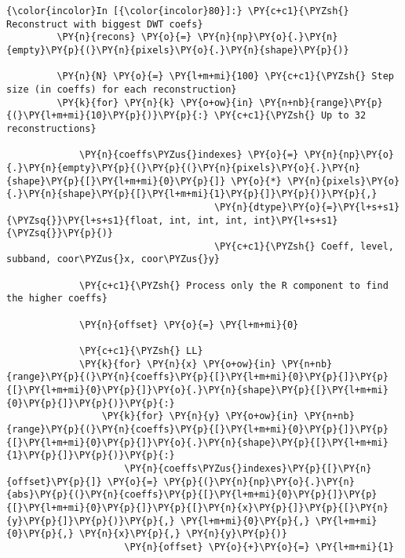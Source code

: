     \begin{Verbatim}[commandchars=\\\{\}]
{\color{incolor}In [{\color{incolor}80}]:} \PY{c+c1}{\PYZsh{} Reconstruct with biggest DWT coefs}
         \PY{n}{recons} \PY{o}{=} \PY{n}{np}\PY{o}{.}\PY{n}{empty}\PY{p}{(}\PY{n}{pixels}\PY{o}{.}\PY{n}{shape}\PY{p}{)}
         
         \PY{n}{N} \PY{o}{=} \PY{l+m+mi}{100} \PY{c+c1}{\PYZsh{} Step size (in coeffs) for each reconstruction}
         \PY{k}{for} \PY{n}{k} \PY{o+ow}{in} \PY{n+nb}{range}\PY{p}{(}\PY{l+m+mi}{10}\PY{p}{)}\PY{p}{:} \PY{c+c1}{\PYZsh{} Up to 32 reconstructions}
         
             \PY{n}{coeffs\PYZus{}indexes} \PY{o}{=} \PY{n}{np}\PY{o}{.}\PY{n}{empty}\PY{p}{(}\PY{p}{(}\PY{n}{pixels}\PY{o}{.}\PY{n}{shape}\PY{p}{[}\PY{l+m+mi}{0}\PY{p}{]} \PY{o}{*} \PY{n}{pixels}\PY{o}{.}\PY{n}{shape}\PY{p}{[}\PY{l+m+mi}{1}\PY{p}{]}\PY{p}{)}\PY{p}{,}
                                     \PY{n}{dtype}\PY{o}{=}\PY{l+s+s1}{\PYZsq{}}\PY{l+s+s1}{float, int, int, int, int}\PY{l+s+s1}{\PYZsq{}}\PY{p}{)}
                                     \PY{c+c1}{\PYZsh{} Coeff, level, subband, coor\PYZus{}x, coor\PYZus{}y}
         
             \PY{c+c1}{\PYZsh{} Process only the R component to find the higher coeffs}
             
             \PY{n}{offset} \PY{o}{=} \PY{l+m+mi}{0}
             
             \PY{c+c1}{\PYZsh{} LL}
             \PY{k}{for} \PY{n}{x} \PY{o+ow}{in} \PY{n+nb}{range}\PY{p}{(}\PY{n}{coeffs}\PY{p}{[}\PY{l+m+mi}{0}\PY{p}{]}\PY{p}{[}\PY{l+m+mi}{0}\PY{p}{]}\PY{o}{.}\PY{n}{shape}\PY{p}{[}\PY{l+m+mi}{0}\PY{p}{]}\PY{p}{)}\PY{p}{:}
                 \PY{k}{for} \PY{n}{y} \PY{o+ow}{in} \PY{n+nb}{range}\PY{p}{(}\PY{n}{coeffs}\PY{p}{[}\PY{l+m+mi}{0}\PY{p}{]}\PY{p}{[}\PY{l+m+mi}{0}\PY{p}{]}\PY{o}{.}\PY{n}{shape}\PY{p}{[}\PY{l+m+mi}{1}\PY{p}{]}\PY{p}{)}\PY{p}{:}
                     \PY{n}{coeffs\PYZus{}indexes}\PY{p}{[}\PY{n}{offset}\PY{p}{]} \PY{o}{=} \PY{p}{(}\PY{n}{np}\PY{o}{.}\PY{n}{abs}\PY{p}{(}\PY{n}{coeffs}\PY{p}{[}\PY{l+m+mi}{0}\PY{p}{]}\PY{p}{[}\PY{l+m+mi}{0}\PY{p}{]}\PY{p}{[}\PY{n}{x}\PY{p}{]}\PY{p}{[}\PY{n}{y}\PY{p}{]}\PY{p}{)}\PY{p}{,} \PY{l+m+mi}{0}\PY{p}{,} \PY{l+m+mi}{0}\PY{p}{,} \PY{n}{x}\PY{p}{,} \PY{n}{y}\PY{p}{)}
                     \PY{n}{offset} \PY{o}{+}\PY{o}{=} \PY{l+m+mi}{1}
             

\end{Verbatim}
